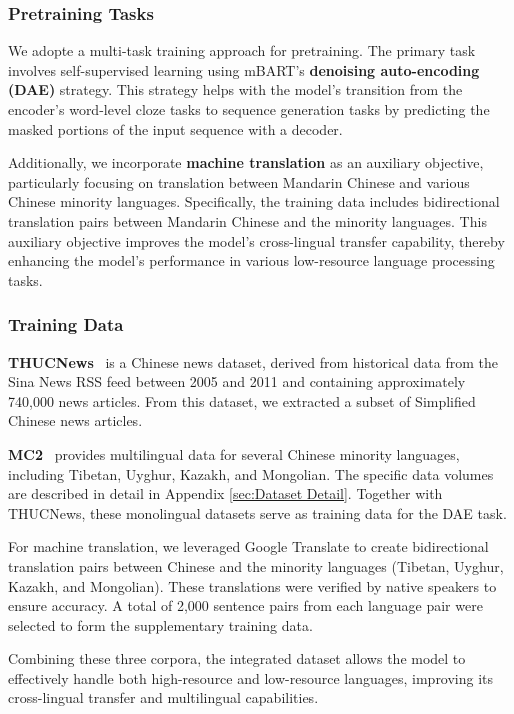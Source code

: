 \subsubsection{Pretraining Tasks}
We adopte a multi-task training approach for pretraining. The primary task involves self-supervised learning using mBART's \textbf{denoising auto-encoding (DAE)} strategy. This strategy helps with the model's transition from the encoder's word-level cloze tasks to sequence generation tasks by predicting the masked portions of the input sequence with a decoder.

Additionally, we incorporate \textbf{machine translation} as an auxiliary objective, particularly focusing on translation between Mandarin Chinese and various Chinese minority languages. Specifically, the training data includes bidirectional translation pairs between Mandarin Chinese and the minority languages. This auxiliary objective improves the model's cross-lingual transfer capability, thereby enhancing the model's performance in various low-resource language processing tasks.

\subsubsection{Training Data}
\textbf{THUCNews}~\cite{thucnews} is a Chinese news dataset, derived from historical data from the Sina News RSS feed between 2005 and 2011 and containing approximately 740,000 news articles. From this dataset, we extracted a subset of Simplified Chinese news articles.

\textbf{MC2}~\cite{mc2} provides multilingual data for several Chinese minority languages, including Tibetan, Uyghur, Kazakh, and Mongolian. The specific data volumes are described in detail in Appendix \ref{sec:Dataset Detail}. Together with THUCNews, these monolingual datasets serve as training data for the DAE task.

For machine translation, we leveraged Google Translate to create bidirectional translation pairs between Chinese and the minority languages (Tibetan, Uyghur, Kazakh, and Mongolian). These translations were verified by native speakers to ensure accuracy. A total of 2,000 sentence pairs from each language pair were selected to form the supplementary training data.

Combining these three corpora, the integrated dataset allows the model to effectively handle both high-resource and low-resource languages, improving its cross-lingual transfer and multilingual capabilities.